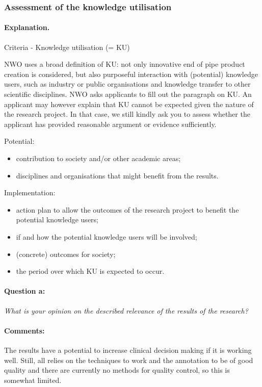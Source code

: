 \documentclass[serif, twocolumn, numeric, rga]{jote-article}
\begin{document}
 {}\subsubsection*{Assessment of the knowledge utilisation} 
\paragraph{Explanation.}
Criteria - Knowledge utilisation (= KU) 

NWO uses a broad definition of KU: not only innovative end of pipe product creation is considered, but also purposeful interaction with (potential) knowledge users, such as industry or public organisations and knowledge transfer to other scientific disciplines. NWO asks applicants to fill out the paragraph on KU. An applicant may however explain that KU cannot be expected given the nature of the research project. In that case, we still kindly ask you to assess whether the applicant has provided reasonable argument or evidence sufficiently. 

\noindent Potential: \begin{itemize} \item contribution to society and/or other academic areas; \item disciplines and organisations that might benefit from the results. \end{itemize}
Implementation: \begin{itemize} \item action plan to allow the outcomes of the research project to benefit the potential knowledge users; \item if and how the potential knowledge users will be involved; \item (concrete) outcomes for society; \item the period over which KU is expected to occur.\end{itemize}
\paragraph{Question a:}
\textit{What is your opinion on the described relevance of the results of the research?}
\paragraph{Comments:}
The results have a potential to increase clinical decision making if it is working well. Still, all relies on the techniques to work and the annotation to be of good quality and there are currently no methods for quality control, so this is somewhat limited.
\end{document}
